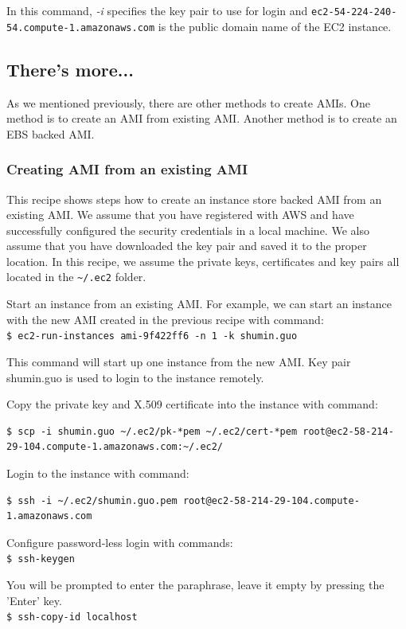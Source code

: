 In this command, \emph{-i} specifies the key pair to use for login and \verb|ec2-54-224-240-54.compute-1.amazonaws.com| is the public domain name of the EC2 instance.

\subsection*{There's more...}
As we mentioned previously, there are other methods to create AMIs. One method is to create an AMI from existing AMI. Another method is to create an EBS backed AMI.

\subsubsection*{Creating AMI from an existing AMI}
This recipe shows steps how to create an instance store backed AMI from an existing AMI. We assume that you have registered with AWS and have successfully configured the security credentials in a local machine. We also assume that you have downloaded the key pair and saved it to the proper location. In this recipe, we assume the private keys, certificates and key pairs all located in the \verb|~/.ec2| folder.

Start an instance from an existing AMI. For example, we can start an instance with the new AMI created in the previous recipe with command: \\
\verb|$ ec2-run-instances ami-9f422ff6 -n 1 -k shumin.guo|

This command will start up one instance from the new AMI. Key pair shumin.guo is used to login to the instance remotely.


Copy the private key and X.509 certificate into the instance with command:
\lstset{style=bashstyle}
\begin{lstlisting}
$ scp -i shumin.guo ~/.ec2/pk-*pem ~/.ec2/cert-*pem root@ec2-58-214-29-104.compute-1.amazonaws.com:~/.ec2/
\end{lstlisting}

Login to the instance with command:
\lstset{style=bashstyle}
\begin{lstlisting}
$ ssh -i ~/.ec2/shumin.guo.pem root@ec2-58-214-29-104.compute-1.amazonaws.com
\end{lstlisting}

Configure password-less login with commands: \\
\verb|$ ssh-keygen|

You will be prompted to enter the paraphrase, leave it empty by pressing the 'Enter' key. \\
\verb|$ ssh-copy-id localhost|

